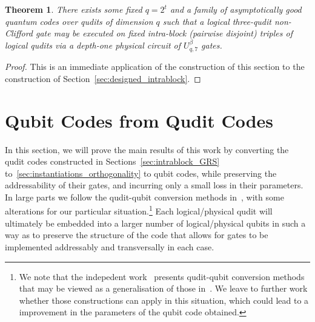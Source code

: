 \documentclass[11pt]{article}
\newtheorem{theorem}{Theorem}[section]
\theoremstyle{definition}
\begin{document}
\begin{theorem}\label{thm:designed_intrablock_AG_qudit}
    There exists some fixed $q = 2^t$ and a family of asymptotically good quantum codes over qudits of dimension $q$ such that a logical three-qudit non-Clifford gate may be executed on fixed intra-block (pairwise disjoint) triples of logical qudits via a depth-one physical circuit of $U_{q,7}^\beta$ gates.
\end{theorem}
\begin{proof}
    This is an immediate application of the construction of this section to the construction of Section~\ref{sec:designed_intrablock}.
\end{proof}







\section{Qubit Codes from Qudit Codes}
\label{sec:concatenation}

In this section, we will prove the main results of this work by converting the qudit codes constructed in Sections~\ref{sec:intrablock_GRS} to~\ref{sec:instantiations_orthogonality} to qubit codes, while preserving the addressability of their gates, and incurring only a small loss in their parameters. In large parts we follow the qudit-qubit conversion methods in~\cite{nguyen2024goodbinaryquantumcodes}, with some alterations for our particular situation.\footnote{We note that the indepedent work~\cite{golowich2024asymptoticallygoodquantumcodes} presents qudit-qubit conversion methods that may be viewed as a generalisation of those in~\cite{nguyen2024goodbinaryquantumcodes}. We leave to further work whether those constructions can apply in this situation, which could lead to a improvement in the parameters of the qubit code obtained.} Each logical/physical qudit will ultimately be embedded into a larger number of logical/physical qubits in such a way as to preserve the structure of the code that allows for gates to be implemented addressably and transversally in each case.
\end{document}
